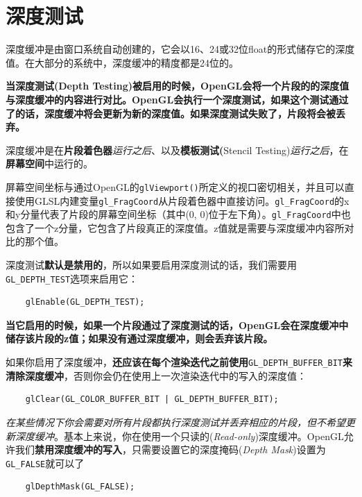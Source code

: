 \documentclass[UTF8,a4paper,12pt]{ctexbook}
\begin{document}
			
			
			
	\section{深度测试}
		深度缓冲是由窗口系统自动创建的，它会以16、24或32位float的形式储存它的深度值。在大部分的系统中，深度缓冲的精度都是24位的。
		
		\textbf{当深度测试(Depth Testing)被启用的时候，OpenGL会将一个片段的的深度值与深度缓冲的内容进行对比。OpenGL会执行一个深度测试，如果这个测试通过了的话，深度缓冲将会更新为新的深度值。如果深度测试失败了，片段将会被丢弃。}
	
		深度缓冲是在\textbf{片段着色器}\textit{运行之后}、以及\textbf{模板测试(}Stencil Testing)\textit{运行之后}，在\textbf{屏幕空间}中运行的。
		
		屏幕空间坐标与通过OpenGL的\verb|glViewport()|所定义的视口密切相关，并且可以直接使用GLSL内建变量\verb|gl_FragCoord|从片段着色器中直接访问。\verb|gl_FragCoord|的x和y分量代表了片段的屏幕空间坐标（其中(0, 0)位于左下角）。\verb|gl_FragCoord|中也包含了一个z分量，它包含了片段真正的深度值。z值就是需要与深度缓冲内容所对比的那个值。
		
		深度测试\textbf{默认是禁用的}，所以如果要启用深度测试的话，我们需要用\verb|GL_DEPTH_TEST|选项来启用它：
		\begin{lstlisting}
	glEnable(GL_DEPTH_TEST);
		\end{lstlisting}
		
		\textbf{当它启用的时候，如果一个片段通过了深度测试的话，OpenGL会在深度缓冲中储存该片段的z值；如果没有通过深度缓冲，则会丢弃该片段。}
		
		如果你启用了深度缓冲，\textbf{还应该在每个渲染迭代之前使用}\verb|GL_DEPTH_BUFFER_BIT|\textbf{来清除深度缓冲}，否则你会仍在使用上一次渲染迭代中的写入的深度值：
		
		\begin{lstlisting}
	glClear(GL_COLOR_BUFFER_BIT | GL_DEPTH_BUFFER_BIT);		
		\end{lstlisting}
		
		\textit{在某些情况下你会需要对所有片段都执行深度测试并丢弃相应的片段，但不希望更新深度缓冲}。基本上来说，你在使用一个只读的(\textit{Read-only})深度缓冲。OpenGL允许我们\textbf{禁用深度缓冲的写入}，只需要设置它的深度掩码(\textit{Depth Mask})设置为\verb|GL_FALSE|就可以了
		
		\begin{lstlisting}
	glDepthMask(GL_FALSE);		
		\end{lstlisting}
		
\end{document}
